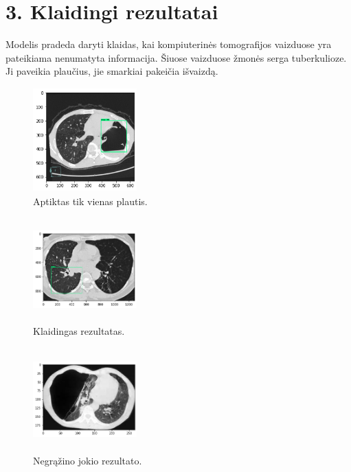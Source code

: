 \documentclass{VUMIFInfKursinis}
\begin{document}
\section*{3. Klaidingi rezultatai}
\par
Modelis pradeda daryti klaidas, kai kompiuterinės tomografijos vaizduose yra pateikiama nenumatyta informacija. Šiuose vaizduose žmonės serga tuberkulioze. Ji paveikia plaučius, jie smarkiai pakeičia išvaizdą.

\begin{figure}[ht]
  \centering
  \includegraphics[width=4cm,height=4cm,keepaspectratio]{tub1.png}
  \caption{Aptiktas tik vienas plautis.}
  \label{fig:kaukė1}
\end{figure} 

\begin{figure}[ht]
  \centering
  \includegraphics[width=4cm,height=4cm,keepaspectratio]{tub2.png}
  \caption{Klaidingas rezultatas.}
  \label{fig:kaukė1}
\end{figure} 
 
\begin{figure}[ht]
  \centering
  \includegraphics[width=4cm,height=4cm,keepaspectratio]{tub3.png}
  \caption{Negrąžino jokio rezultato.}
  \label{fig:kaukė1}
\end{figure} 
\end{document}
